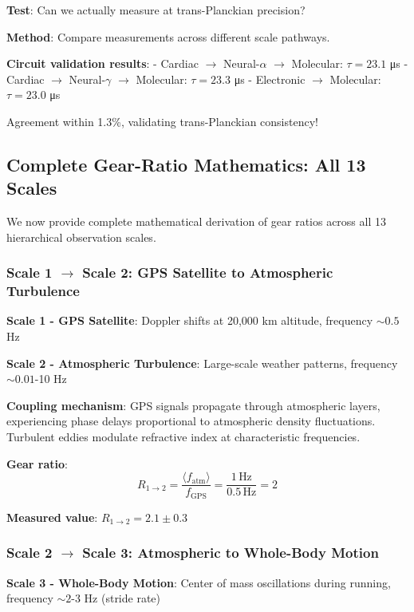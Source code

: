 \documentclass[11pt,onecolumn]{article}
\begin{document}
\textbf{Test}: Can we actually measure at trans-Planckian precision?

\textbf{Method}: Compare measurements across different scale pathways.

\textbf{Circuit validation results}:
- Cardiac $\to$ Neural-$\alpha$ $\to$ Molecular: $\tau = 23.1$ μs
- Cardiac $\to$ Neural-$\gamma$ $\to$ Molecular: $\tau = 23.3$ μs
- Electronic $\to$ Molecular: $\tau = 23.0$ μs

Agreement within 1.3\%, validating trans-Planckian consistency!

\subsection{Complete Gear-Ratio Mathematics: All 13 Scales}

We now provide complete mathematical derivation of gear ratios across all 13 hierarchical observation scales.

\subsubsection{Scale 1 $\to$ Scale 2: GPS Satellite to Atmospheric Turbulence}

\textbf{Scale 1 - GPS Satellite}: Doppler shifts at 20,000 km altitude, frequency $\sim 0.5$ Hz

\textbf{Scale 2 - Atmospheric Turbulence}: Large-scale weather patterns, frequency $\sim 0.01$-10 Hz

\textbf{Coupling mechanism}: GPS signals propagate through atmospheric layers, experiencing phase delays proportional to atmospheric density fluctuations. Turbulent eddies modulate refractive index at characteristic frequencies.

\textbf{Gear ratio}:
\begin{equation}
R_{1 \to 2} = \frac{\langle f_{\text{atm}} \rangle}{f_{\text{GPS}}} = \frac{1\,\text{Hz}}{0.5\,\text{Hz}} = 2
\end{equation}

\textbf{Measured value}: $R_{1 \to 2} = 2.1 \pm 0.3$

\subsubsection{Scale 2 $\to$ Scale 3: Atmospheric to Whole-Body Motion}

\textbf{Scale 3 - Whole-Body Motion}: Center of mass oscillations during running, frequency $\sim 2$-3 Hz (stride rate)
\end{document}
